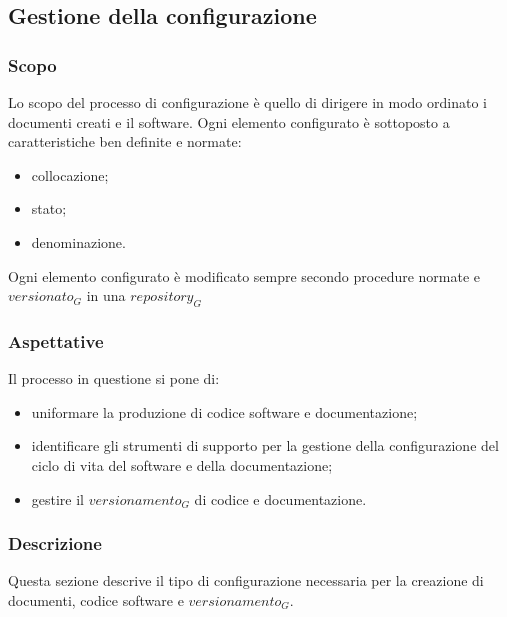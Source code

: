 \subsection{Gestione della configurazione}\label{3.2}

\subsubsection{Scopo}\label{3.2.1}
Lo scopo del processo di configurazione è quello di dirigere in modo ordinato i documenti creati e il software. Ogni elemento configurato è sottoposto a caratteristiche ben definite e normate:
\begin{itemize}
 \item collocazione;
 \item stato;
 \item denominazione.
\end{itemize}
Ogni elemento configurato è modificato sempre secondo procedure normate e $versionato_G$ in una $repository_G$

\subsubsection{Aspettative}
Il processo in questione si pone di:
\begin{itemize}
\item uniformare la produzione di codice software e documentazione;
\item identificare gli strumenti di supporto per la gestione della configurazione del ciclo di vita del software e della documentazione;
\item gestire il $versionamento_G$ di codice e documentazione.
\end{itemize}


\subsubsection{Descrizione}
Questa sezione descrive il tipo di configurazione necessaria per la creazione di documenti, codice software e $versionamento_G$.


